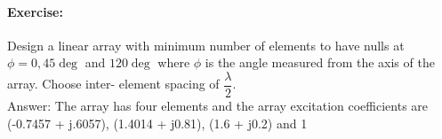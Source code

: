 	\paragraph{Exercise:}
	Design a linear array with minimum number of elements to have nulls at $\phi = 0, 45\deg$ and $120\deg$ where $\phi$ is the angle measured from the axis of the array. Choose inter- element spacing of $\dfrac{\lambda}{2}$. 
	\\
	Answer: The array has four elements and the array excitation coefficients are (-0.7457 + j.6057), (1.4014 + j0.81), (1.6 + j0.2) and 1 